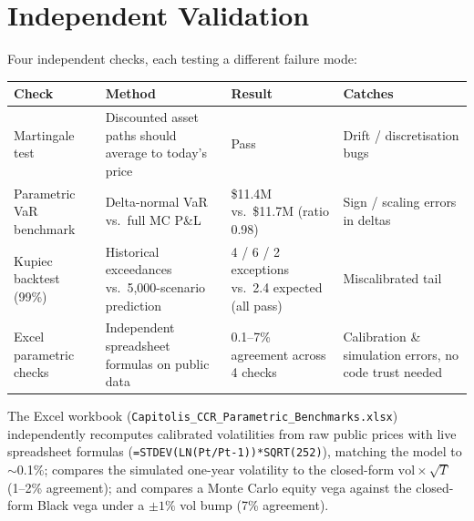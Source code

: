 \documentclass[10pt,letterpaper]{article}
\begin{document}
\section{Independent Validation}\label{sec:validation}
Four independent checks, each testing a different failure mode:
\begin{center}\small
\begin{tabular}{p{}p{}p{}p{}}
\toprule
\textbf{Check} & \textbf{Method} & \textbf{Result} & \textbf{Catches} \\
\midrule
Martingale test & Discounted asset paths should average to today's price & Pass & Drift / discretisation bugs \\
Parametric VaR benchmark & Delta-normal VaR vs.\ full MC P\&L & \$11.4M vs.\ \$11.7M (ratio 0.98) & Sign / scaling errors in deltas \\
Kupiec backtest (99\%) & Historical exceedances vs.\ 5,000-scenario prediction & 4 / 6 / 2 exceptions vs.\ 2.4 expected (all pass) & Miscalibrated tail \\
Excel parametric checks & Independent spreadsheet formulas on public data & 0.1--7\% agreement across 4 checks & Calibration \& simulation errors, no code trust needed \\
\bottomrule
\end{tabular}
\end{center}
The Excel workbook (\texttt{Capitolis\_CCR\_Parametric\_Benchmarks.xlsx}) independently recomputes calibrated volatilities from raw public prices with live spreadsheet formulas (\texttt{=STDEV(LN(Pt/Pt-1))*SQRT(252)}), matching the model to $\sim$0.1\%; compares the simulated one-year volatility to the closed-form $\text{vol}\times\sqrt{T}$ (1--2\% agreement); and compares a Monte Carlo equity vega against the closed-form Black vega under a $\pm1\%$ vol bump (7\% agreement).
\end{document}
